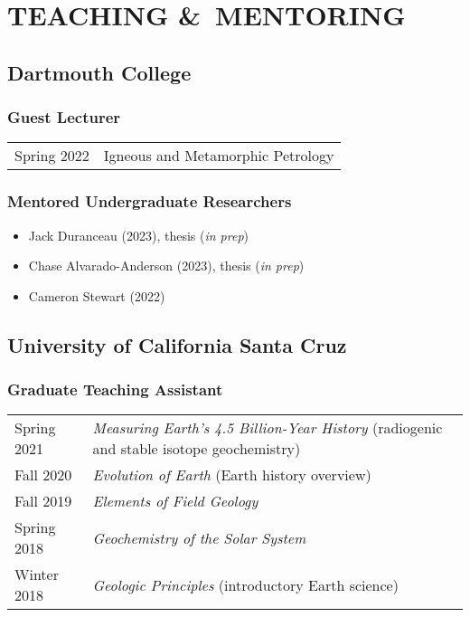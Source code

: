\section*{TEACHING \&\ MENTORING}
\subsection*{\textbf{Dartmouth College}}
\subsubsection*{Guest Lecturer}
\begin{tabular}{p{.15\linewidth} p{.85\linewidth}} %
Spring 2022 & Igneous and Metamorphic Petrology
\end{tabular}

\subsubsection*{Mentored Undergraduate Researchers}
\begin{itemize}
	\item Jack Duranceau (2023), thesis (\textit{in prep})
	\item Chase Alvarado-Anderson (2023), thesis (\textit{in prep})
	\item Cameron Stewart (2022)
\end{itemize}

\subsection*{\textbf{University of California Santa Cruz}}
\subsubsection*{Graduate Teaching Assistant}
\begin{tabular}{p{.15\linewidth} p{.85\linewidth}} %
	Spring 2021 & \textit{Measuring Earth’s 4.5 Billion-Year History} (radiogenic and stable isotope geochemistry)\\
	Fall 2020 & \textit{Evolution of Earth} (Earth history overview) \\
	Fall 2019 & \textit{Elements of Field Geology}\\
	Spring 2018 & \textit{Geochemistry of the Solar System}\\
	Winter 2018 & \textit{Geologic Principles} (introductory Earth science)
\end{tabular}

